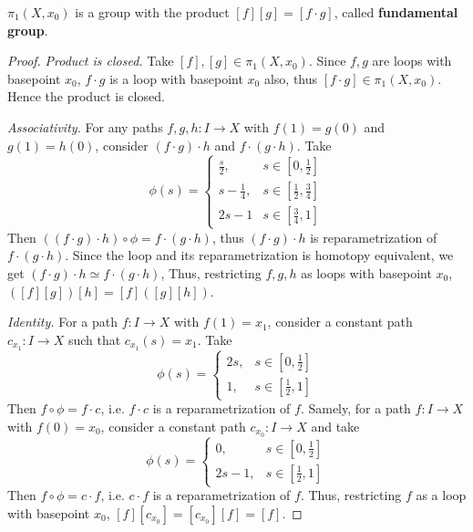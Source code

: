 \begin{prop} $\pi_1(X,x_0)$ is a group with the product $[f][g]=[f\cdot g]$, called \textbf{fundamental group}.
\end{prop}
\begin{proof} \textit{Product is closed.} Take $[f],[g]\in\pi_1(X,x_0)$. Since $f,g$ are loops with basepoint $x_0$, $f\cdot g$ is a loop with basepoint $x_0$ also, thus $[f\cdot g]\in\pi_1(X,x_0)$. Hence the product is closed.

\textit{Associativity.} For any paths $f,g,h:I\rightarrow X$ with $f(1)=g(0)$ and $g(1)=h(0)$, consider $(f\cdot g)\cdot h$ and $f\cdot(g\cdot h)$. Take
\begin{equation}
\phi(s)=\begin{cases}
\frac{s}{2},&s\in [0,\frac{1}{2}]\\
s-\frac{1}{4}, &s\in [\frac{1}{2},\frac{3}{4}]\\
2s-1&s\in [\frac{3}{4},1]
\end{cases}
\end{equation}
Then $((f\cdot g)\cdot h)\circ \phi=f\cdot (g\cdot h)$, thus $(f\cdot g)\cdot h$ is reparametrization of $f\cdot(g\cdot h)$. Since the loop and its reparametrization is homotopy equivalent, we get $(f\cdot g)\cdot h\simeq f\cdot(g\cdot h)$, Thus, restricting $f,g,h$ as loops with basepoint $x_0$, $([f][g])[h]=[f]([g][h])$.

\textit{Identity.} For a path $f:I\rightarrow X$ with $f(1)=x_1$, consider a constant path $c_{x_1}:I\rightarrow X$ such that $c_{x_1}(s)=x_1$. Take
\begin{equation}
\phi(s)=\begin{cases}
2s,&s\in[0,\frac{1}{2}]\\
1,&s\in[\frac{1}{2},1]
\end{cases}
\end{equation}
Then $f\circ \phi=f\cdot c$, i.e. $f\cdot c$ is a reparametrization of $f$. Samely, for a path $f:I\rightarrow X$ with $f(0)=x_0$, consider a constant path $c_{x_0}:I\rightarrow X$ and take
\begin{equation}
\phi(s)=\begin{cases}
0,&s\in[0,\frac{1}{2}]\\
2s-1,&s\in[\frac{1}{2},1]
\end{cases}
\end{equation}
Then $f\circ \phi=c\cdot f$, i.e. $c\cdot f$ is a reparametrization of $f$. Thus, restricting $f$ as a loop with basepoint $x_0$, $[f][c_{x_0}]=[c_{x_0}][f]=[f]$.


\end{proof}
